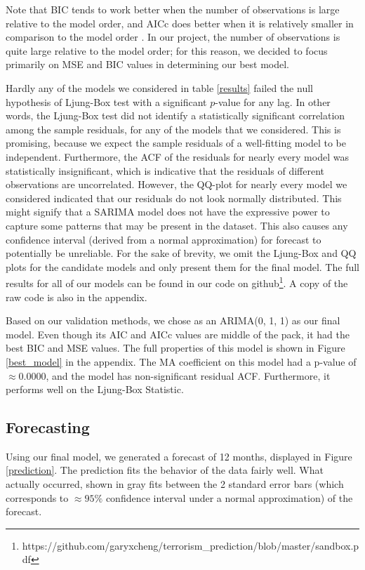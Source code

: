 \documentclass[11pt]{paper}
\begin{document}
Note that BIC tends to work better when the number of observations is large relative to the model order, and AICc does better when it is relatively smaller in comparison to the model order \cite{timeseriesanalysis}. In our project, the number of observations is quite large relative to the model order; for this reason, we decided to focus primarily on MSE and BIC values in determining our best model.

Hardly any of the models we considered in table \ref{results} failed the null hypothesis of Ljung-Box test with a significant $p$-value for any lag. In other words, the Ljung-Box test did not identify a statistically significant correlation among the sample residuals, for any of the models that we considered. This is promising, because we expect the sample residuals of a well-fitting model to be independent. Furthermore, the ACF of the residuals for nearly every model was statistically insignificant, which is indicative that the residuals of different observations are uncorrelated. However, the QQ-plot for nearly every model we considered indicated that our residuals do not look normally distributed. This might signify that a SARIMA model does not have the expressive power to capture some patterns that may be present in the dataset. This also causes any confidence interval (derived from a normal approximation) for forecast to potentially be unreliable. For the sake of brevity, we omit the Ljung-Box and QQ plots for the candidate models and only present them for the final model. The full results for all of our models can be found in our code on github\footnote{https://github.com/garyxcheng/terrorism_prediction/blob/master/sandbox.pdf}. A copy of the raw code is also in the appendix.

Based on our validation methods, we chose as an ARIMA(0, 1, 1) as our final model. Even though its AIC and AICc values are middle of the pack, it had the best BIC and MSE values. The full properties of this model is shown in Figure \ref{best_model} in the appendix. The MA coefficient on this model had a p-value of $\approx 0.0000$, and the model has non-significant residual ACF. Furthermore, it performs well on the Ljung-Box Statistic.




\subsection{Forecasting}

Using our final model, we generated a forecast of 12 months, displayed in Figure \ref{prediction}. The prediction fits the behavior of the data fairly well.  What actually occurred, shown in gray fits between the 2 standard error bars (which corresponds to $\approx 95\%$ confidence interval under a normal approximation) of the forecast.
\end{document}
